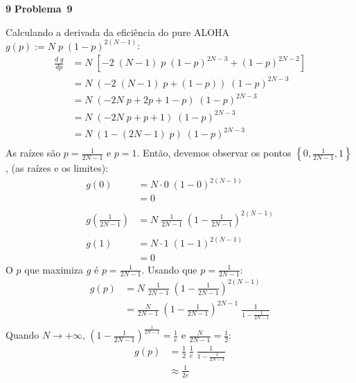 \documentclass{article}
\newcounter{exe-list}
\newenvironment{exe}[2][Problema]
    {\newcommand{\opt}{(Opcional)}%
    \newcommand{\sketch}[1]{{\bfseries Rascunho:} ##1}%
    \medskip\par\noindent\ifthenelse{\equal{#1}{}}
        {\textbf{\large #2}}
        {\textbf{\large #1~#2}}%
    \medskip\par\noindent}
    {\medskip}
\begin{document}
\begin{exe}{9}
    Calculando a derivada da eficiência do pure ALOHA
    \(g(p) := N \; p \; (1 - p)^{2(N-1)}\):
    \begin{align*}
        \frac{d \; g}{dp}
        &= N \; \left[
            -2 \; (N-1) \; p \; (1 - p)^{2N-3} + (1 - p)^{2N-2}
        \right] \\
        &= N \; ( -2 \; (N-1) \; p + (1 - p) ) \; (1 - p)^{2N-3} \\
        &= N \; ( -2N \; p + 2 p + 1 - p ) \; (1 - p)^{2N-3} \\
        &= N \; ( -2N \; p + p + 1 ) \; (1 - p)^{2N-3} \\
        &= N \; (1 - (2N-1) \; p) \; (1 - p)^{2N-3} \\
    \end{align*}
    As raízes são \(p = \frac{1}{2N - 1}\) e \(p = 1\).
    Então, devemos observar os pontos
    \( \left\{ 0, \frac{1}{2N-1}, 1 \right\}\),
    (as raízes e os limites):
    \begin{align*}
        g(0)
            &= N \cdot 0 \; (1 - 0)^{2(N-1)} \\
            &= 0 \\\\
        g\left(\frac{1}{2N-1}\right)
            &= N \; \frac{1}{2N-1} \; \left(1 - \frac{1}{2N-1}\right)^{2(N-1)} \\\\
        g(1)
            &= N \cdot 1 \; (1 - 1)^{2(N-1)} \\
            &= 0
    \end{align*}
    O \(p\) que maximiza \(g\) é \(p = \frac{1}{2N-1}\).
    Usando que \(p = \frac{1}{2N-1}\):
    \begin{align*}
        g(p)
        &= N \; \frac{1}{2N-1} \; \left(1 - \frac{1}{2N-1}\right)^{2(N-1)} \\
        &= \frac{N}{2N-1}
            \; \left(1 - \frac{1}{2N-1}\right)^{2N-1}
            \; \frac{1}{1 - \frac{1}{2N-1}} \\
    \end{align*}
    Quando \(N \to +\infty\),
    \(\left(1 - \frac{1}{2N-1}\right)^\frac{1}{2N-1}= \frac1e\) e
    \(\frac{N}{2N-1} = \frac12\):
    \begin{align*}
        g(p)
        &= \frac12 \; \frac1e \; \frac{1}{1 - \frac{1}{2N-1}} \\
        &\approx \frac{1}{2e}
    \end{align*}
\end{exe}
\end{document}
